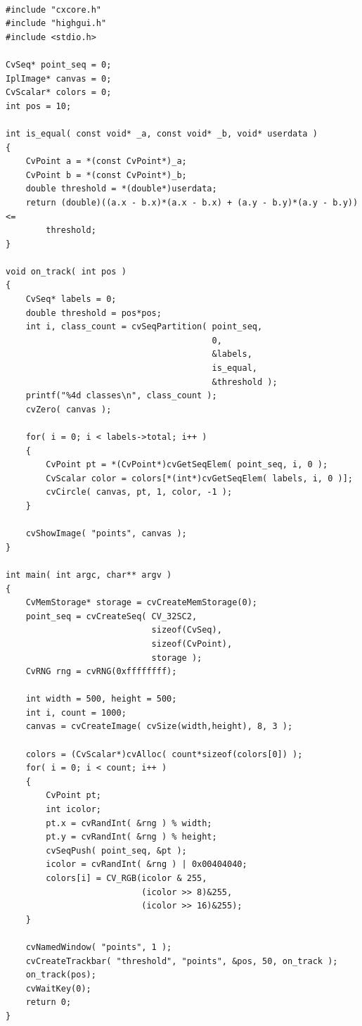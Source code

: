 \begin{lstlisting}

#include "cxcore.h"
#include "highgui.h"
#include <stdio.h>

CvSeq* point_seq = 0;
IplImage* canvas = 0;
CvScalar* colors = 0;
int pos = 10;

int is_equal( const void* _a, const void* _b, void* userdata )
{
    CvPoint a = *(const CvPoint*)_a;
    CvPoint b = *(const CvPoint*)_b;
    double threshold = *(double*)userdata;
    return (double)((a.x - b.x)*(a.x - b.x) + (a.y - b.y)*(a.y - b.y)) <=
        threshold;
}

void on_track( int pos )
{
    CvSeq* labels = 0;
    double threshold = pos*pos;
    int i, class_count = cvSeqPartition( point_seq,
                                         0,
                                         &labels,
                                         is_equal,
                                         &threshold );
    printf("%4d classes\n", class_count );
    cvZero( canvas );

    for( i = 0; i < labels->total; i++ )
    {
        CvPoint pt = *(CvPoint*)cvGetSeqElem( point_seq, i, 0 );
        CvScalar color = colors[*(int*)cvGetSeqElem( labels, i, 0 )];
        cvCircle( canvas, pt, 1, color, -1 );
    }

    cvShowImage( "points", canvas );
}

int main( int argc, char** argv )
{
    CvMemStorage* storage = cvCreateMemStorage(0);
    point_seq = cvCreateSeq( CV_32SC2,
                             sizeof(CvSeq),
                             sizeof(CvPoint),
                             storage );
    CvRNG rng = cvRNG(0xffffffff);

    int width = 500, height = 500;
    int i, count = 1000;
    canvas = cvCreateImage( cvSize(width,height), 8, 3 );

    colors = (CvScalar*)cvAlloc( count*sizeof(colors[0]) );
    for( i = 0; i < count; i++ )
    {
        CvPoint pt;
        int icolor;
        pt.x = cvRandInt( &rng ) % width;
        pt.y = cvRandInt( &rng ) % height;
        cvSeqPush( point_seq, &pt );
        icolor = cvRandInt( &rng ) | 0x00404040;
        colors[i] = CV_RGB(icolor & 255,
                           (icolor >> 8)&255,
                           (icolor >> 16)&255);
    }

    cvNamedWindow( "points", 1 );
    cvCreateTrackbar( "threshold", "points", &pos, 50, on_track );
    on_track(pos);
    cvWaitKey(0);
    return 0;
}
\end{lstlisting}


